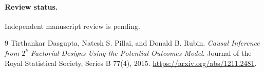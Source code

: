 \documentclass[11pt]{article}
\begin{document}
\paragraph{Review status.} Independent manuscript review is pending.

\begin{thebibliography}{9}
Tirthankar Dasgupta, Natesh S. Pillai, and Donald B. Rubin.
\emph{Causal Inference from $2^k$ Factorial Designs Using the
Potential Outcomes Model}. Journal of the Royal Statistical Society,
Series B 77(4), 2015. \url{https://arxiv.org/abs/1211.2481}.
\end{thebibliography}
\end{document}
